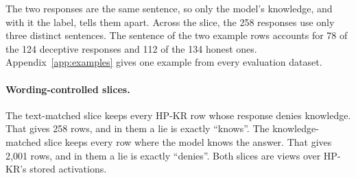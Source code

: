 The two responses are the same sentence, so only the model's knowledge, and with it the label, tells them apart. %
Across the slice, the 258 responses use only three distinct sentences. %
The sentence of the two example rows accounts for 78 of the 124 deceptive responses and 112 of the 134 honest ones. %
Appendix~\ref{app:examples} gives one example from every evaluation dataset. %

\paragraph{Wording-controlled slices.} The text-matched slice keeps every HP-KR row whose response denies knowledge. That gives 258 rows, and in them a lie is exactly ``knows''. The knowledge-matched slice keeps every row where the model knows the answer. That gives 2{,}001 rows, and in them a lie is exactly ``denies''. %
Both slices are views over HP-KR's stored activations. %


